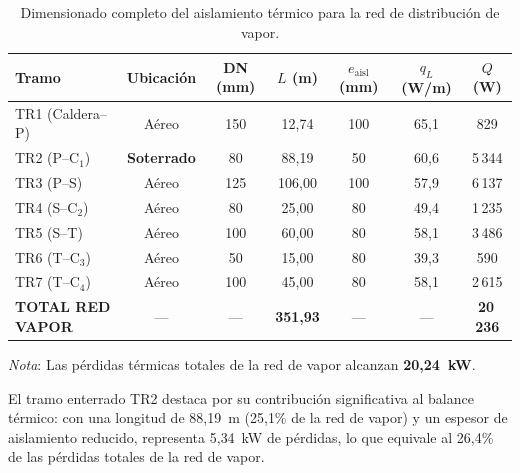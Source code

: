\begin{table}[htbp]
	\centering
	\caption{Dimensionado completo del aislamiento térmico para la red de distribución de vapor.}
	\label{tab:resumen_vapor_completo}
	\begin{tabular}{lcccccc}
		\toprule
		\textbf{Tramo}           & \textbf{Ubicación} & \textbf{DN (mm)} & \textbf{$L$ (m)}  & \textbf{$e_{\text{aisl}}$ (mm)} & \textbf{$q_L$ (W/m)} & \textbf{$Q$ (W)} \\
		\midrule
		TR1 (Caldera--P)         & Aéreo              & 150              & 12{,}74           & 100                             & 65{,}1               & 829              \\
		TR2 (P--C$_1$)           & \textbf{Soterrado} & 80               & 88{,}19           & 50                              & 60{,}6               & 5\,344           \\
		TR3 (P--S)               & Aéreo              & 125              & 106{,}00          & 100                             & 57{,}9               & 6\,137           \\
		TR4 (S--C$_2$)           & Aéreo              & 80               & 25{,}00           & 80                              & 49{,}4               & 1\,235           \\
		TR5 (S--T)               & Aéreo              & 100              & 60{,}00           & 80                              & 58{,}1               & 3\,486           \\
		TR6 (T--C$_3$)           & Aéreo              & 50               & 15{,}00           & 80                              & 39{,}3               & 590              \\
		TR7 (T--C$_4$)           & Aéreo              & 100              & 45{,}00           & 80                              & 58{,}1               & 2\,615           \\
		\midrule
		\textbf{TOTAL RED VAPOR} & ---                & ---              & \textbf{351{,}93} & ---                             & ---                  & \textbf{20\,236} \\
		\bottomrule
	\end{tabular}
	\vspace{0.3cm}

	\noindent \small \textit{Nota}: Las pérdidas térmicas totales de la red de vapor alcanzan \textbf{20{,}24~kW}.
\end{table}

El tramo enterrado TR2 destaca por su contribución significativa al balance térmico: con una longitud de 88{,}19~m (25{,}1\% de la red de vapor) y un espesor de aislamiento reducido, representa 5{,}34~kW de pérdidas, lo que equivale al 26{,}4\% de las pérdidas totales de la red de vapor.

